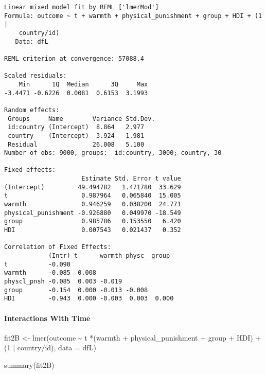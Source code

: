 \documentclass[
  letterpaper,
  DIV=11,
  numbers=noendperiod]{scrreprt}
\let\oldparagraph\paragraph
\renewcommand{\paragraph}[1]{\oldparagraph{#1}\mbox{}}
\newenvironment{Shaded}{\begin{snugshade}}{\end{snugshade}}
\newcommand{\AttributeTok}[1]{\textcolor[rgb]{0.40,0.45,0.13}{#1}}
\newcommand{\DecValTok}[1]{\textcolor[rgb]{0.68,0.00,0.00}{#1}}
\newcommand{\FunctionTok}[1]{\textcolor[rgb]{0.28,0.35,0.67}{#1}}
\newcommand{\NormalTok}[1]{\textcolor[rgb]{0.00,0.23,0.31}{#1}}
\newcommand{\OtherTok}[1]{\textcolor[rgb]{0.00,0.23,0.31}{#1}}
\newcommand{\SpecialCharTok}[1]{\textcolor[rgb]{0.37,0.37,0.37}{#1}}
\begin{document}
\begin{verbatim}
Linear mixed model fit by REML ['lmerMod']
Formula: outcome ~ t + warmth + physical_punishment + group + HDI + (1 |  
    country/id)
   Data: dfL

REML criterion at convergence: 57088.4

Scaled residuals: 
    Min      1Q  Median      3Q     Max 
-3.4471 -0.6226  0.0081  0.6153  3.1993 

Random effects:
 Groups     Name        Variance Std.Dev.
 id:country (Intercept)  8.864   2.977   
 country    (Intercept)  3.924   1.981   
 Residual               26.008   5.100   
Number of obs: 9000, groups:  id:country, 3000; country, 30

Fixed effects:
                     Estimate Std. Error t value
(Intercept)         49.494782   1.471780  33.629
t                    0.987964   0.065840  15.005
warmth               0.946259   0.038200  24.771
physical_punishment -0.926880   0.049970 -18.549
group                0.985786   0.153550   6.420
HDI                  0.007543   0.021437   0.352

Correlation of Fixed Effects:
            (Intr) t      warmth physc_ group 
t           -0.090                            
warmth      -0.085  0.008                     
physcl_pnsh -0.085  0.003 -0.019              
group       -0.154  0.000 -0.013 -0.008       
HDI         -0.943  0.000 -0.003  0.003  0.000
\end{verbatim}

\paragraph{Interactions With Time}\label{interactions-with-time-1}

\begin{Shaded}
\begin{Highlighting}[]
\NormalTok{fit2B }\OtherTok{\textless{}{-}} \FunctionTok{lmer}\NormalTok{(outcome }\SpecialCharTok{\textasciitilde{}}\NormalTok{ t }\SpecialCharTok{*}\NormalTok{(warmth }\SpecialCharTok{+}\NormalTok{ physical\_punishment }\SpecialCharTok{+} 
\NormalTok{               group }\SpecialCharTok{+}\NormalTok{ HDI) }\SpecialCharTok{+}
\NormalTok{               (}\DecValTok{1} \SpecialCharTok{|}\NormalTok{ country}\SpecialCharTok{/}\NormalTok{id),}
             \AttributeTok{data =}\NormalTok{ dfL)}

\FunctionTok{summary}\NormalTok{(fit2B)}
\end{Highlighting}
\end{Shaded}
\end{document}
